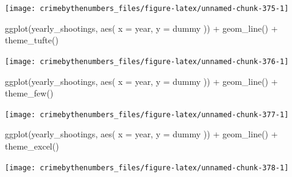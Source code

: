 \documentclass[
]{krantz}
\makeatletter
\newenvironment{Shaded}{\begin{snugshade}}{\end{snugshade}}
\newcommand{\AttributeTok}[1]{\textcolor[rgb]{0.61,0.61,0.61}{#1}}
\newcommand{\FunctionTok}[1]{\textcolor[rgb]{0,0,0}{#1}}
\newcommand{\NormalTok}[1]{#1}
\newcommand{\SpecialCharTok}[1]{\textcolor[rgb]{0,0,0}{#1}}
\newenvironment{kframe}{%
\medskip{}
\setlength{\fboxsep}{.8em}
 \def\at@end@of@kframe{}%
 \ifinner\ifhmode%
  \def\at@end@of@kframe{\end{minipage}}%
  \begin{minipage}{\columnwidth}%
 \fi\fi%
 \def\FrameCommand##1{\hskip\@totalleftmargin \hskip-\fboxsep
 \colorbox{shadecolor}{##1}\hskip-\fboxsep
     \hskip-\linewidth \hskip-\@totalleftmargin \hskip\columnwidth}%
 \MakeFramed {\advance\hsize-\width
   \@totalleftmargin\z@ \linewidth\hsize
   \@setminipage}}%
 {\par\unskip\endMakeFramed%
 \at@end@of@kframe}
\renewenvironment{Shaded}{\begin{kframe}}{\end{kframe}}
\makeatother
\begin{document}
\begin{center}\texttt{[image: crimebythenumbers\_files/figure-latex/unnamed-chunk-375-1]} \end{center}

\begin{Shaded}
\begin{Highlighting}[]
\FunctionTok{ggplot}\NormalTok{(yearly\_shootings, }\FunctionTok{aes}\NormalTok{(}
  \AttributeTok{x =}\NormalTok{ year,}
  \AttributeTok{y =}\NormalTok{ dummy}
\NormalTok{)) }\SpecialCharTok{+}
  \FunctionTok{geom\_line}\NormalTok{() }\SpecialCharTok{+}
  \FunctionTok{theme\_tufte}\NormalTok{()}
\end{Highlighting}
\end{Shaded}

\begin{center}\texttt{[image: crimebythenumbers\_files/figure-latex/unnamed-chunk-376-1]} \end{center}

\begin{Shaded}
\begin{Highlighting}[]
\FunctionTok{ggplot}\NormalTok{(yearly\_shootings, }\FunctionTok{aes}\NormalTok{(}
  \AttributeTok{x =}\NormalTok{ year,}
  \AttributeTok{y =}\NormalTok{ dummy}
\NormalTok{)) }\SpecialCharTok{+}
  \FunctionTok{geom\_line}\NormalTok{() }\SpecialCharTok{+}
  \FunctionTok{theme\_few}\NormalTok{()}
\end{Highlighting}
\end{Shaded}

\begin{center}\texttt{[image: crimebythenumbers\_files/figure-latex/unnamed-chunk-377-1]} \end{center}

\begin{Shaded}
\begin{Highlighting}[]
\FunctionTok{ggplot}\NormalTok{(yearly\_shootings, }\FunctionTok{aes}\NormalTok{(}
  \AttributeTok{x =}\NormalTok{ year,}
  \AttributeTok{y =}\NormalTok{ dummy}
\NormalTok{)) }\SpecialCharTok{+}
  \FunctionTok{geom\_line}\NormalTok{() }\SpecialCharTok{+}
  \FunctionTok{theme\_excel}\NormalTok{()}
\end{Highlighting}
\end{Shaded}

\begin{center}\texttt{[image: crimebythenumbers\_files/figure-latex/unnamed-chunk-378-1]} \end{center}
\end{document}

